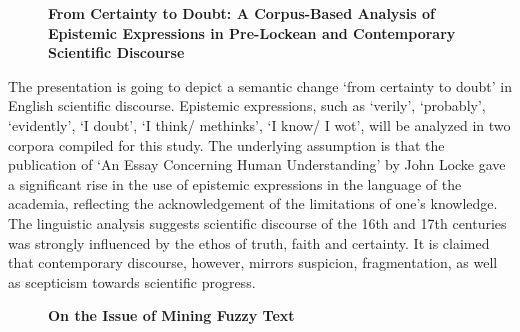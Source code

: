 \documentclass[10pt, a4paper, twopage, headinclude, footinclude, BCOR5mm]{scrartcl}
\begin{document}
\renewcommand{\subsectionmark}[1]{\markright{\thesubsection~#1}} 
\lehead{\mbox{\llap{\small\thepage\kern1em\color{halfgray} \vline}\color{halfgray}\hspace{0.5em}\rightmark\hfil}}

\pagestyle{scrheadings}


\newpage

\begin{figure}[t!]
\centering
\large\textbf{From Certainty to Doubt: A Corpus-Based Analysis of Epistemic Expressions in Pre-Lockean and Contemporary Scientific Discourse}
\vspace*{0.5cm}
\end{figure}


        \begin{table}[t!]
    \end{table}

\noindent
The presentation is going to depict a semantic change `from certainty to doubt' in English scientific discourse. Epistemic expressions, such as `verily', `probably', `evidently', `I doubt', `I think/ methinks', `I know/ I wot', will be analyzed in two corpora compiled for this study. The underlying assumption is that the publication of `An Essay Concerning Human Understanding' by John Locke gave a significant rise in the use of epistemic expressions in the language of the academia, reflecting the acknowledgement of the limitations of one's knowledge. The linguistic analysis suggests scientific discourse of the 16th and 17th centuries was strongly influenced by the ethos of truth, faith and certainty. It is claimed that contemporary discourse, however, mirrors suspicion, fragmentation, as well as scepticism towards scientific progress.  


\newpage

\begin{figure}[t!]
\centering
\large\textbf{On the Issue of Mining Fuzzy Text}
\vspace*{0.5cm}
\end{figure}
\end{document}
